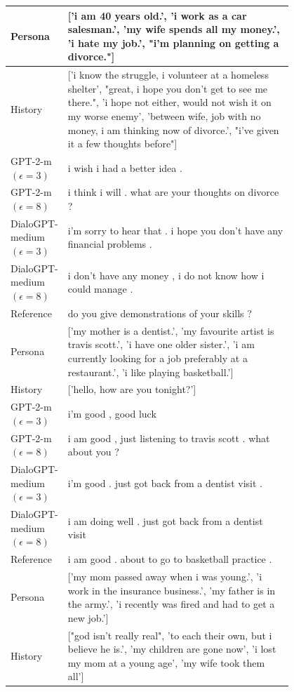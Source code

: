 \begin{table}[h]
\centering
\renewcommand{\arraystretch}{1.2}
\scriptsize
\begin{tabular}{l | p{0.8\linewidth}}
\toprule
Persona & ['i am 40 years old.', 'i work as a car salesman.', 'my wife spends all my money.', 'i hate my job.', "i'm planning on getting a divorce."] \\
 \hline
History & ['i know the struggle, i volunteer at a homeless shelter', "great, i hope you don't get to see me there.", 'i hope not either, would not wish it on my worse enemy', 'between wife, job with no money, i am thinking now of divorce.', "i've given it a few thoughts before"] \\
 \hline
GPT-2-m $(\epsilon=3)$ & i wish i had a better idea . \\
GPT-2-m $(\epsilon=8)$ & i think i will . what are your thoughts on divorce ? \\
DialoGPT-medium $(\epsilon=3)$ & i'm sorry to hear that . i hope you don't have any financial problems . \\
DialoGPT-medium $(\epsilon=8)$ & i don't have any money , i do not know how i could manage . \\
\hline
 Reference & do you give demonstrations of your skills ? \\
\midrule\midrule
Persona & ['my mother is a dentist.', 'my favourite artist is travis scott.', 'i have one older sister.', 'i am currently looking for a job preferably at a restaurant.', 'i like playing basketball.'] \\
 \hline
History & ['hello, how are you tonight?'] \\
 \hline
GPT-2-m $(\epsilon=3)$ & i'm good , good luck \\
GPT-2-m $(\epsilon=8)$ & i am good , just listening to travis scott . what about you ? \\
DialoGPT-medium $(\epsilon=3)$ & i'm good . just got back from a dentist visit . \\
DialoGPT-medium $(\epsilon=8)$ & i am doing well . just got back from a dentist visit \\
\hline
 Reference & i am good . about to go to basketball practice . \\
\midrule\midrule
Persona & ['my mom passed away when i was young.', 'i work in the insurance business.', 'my father is in the army.', 'i recently was fired and had to get a new job.'] \\
 \hline
History & ["god isn't really real", 'to each their own, but i believe he is.', 'my children are gone now', 'i lost my mom at a young age', 'my wife took them all'] \\

\end{tabular}
\end{table}

